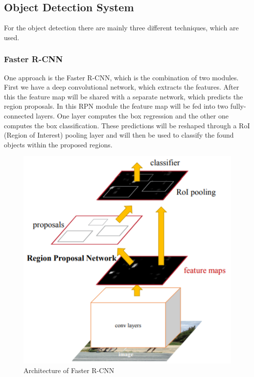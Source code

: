 \subsection{Object Detection System}\label{subsec:object_detection_system}

For the object detection there are mainly three different techniques, which are used.

\subsubsection{Faster R-CNN}

One approach is the Faster R-CNN, which is the combination of two modules. First we have a deep convolutional network, which extracts the features. After this the feature map will be shared with a separate network, which predicts the region proposals. In this RPN module the feature map will be fed into two fully-connected layers. One layer computes the box regression and the other one computes the box classification. These predictions will be reshaped through a RoI (Region of Interest) pooling layer and will then be used to classify the found objects within the proposed regions.

\begin{figure}[H]
\centering
\includegraphics{sources/Faster_R-CNN.png}
\caption[Architecture of Faster R-CNN]{Architecture of Faster R-CNN \cite{tim2}}
\label{fig:depthwise_convolution}
\end{figure}

